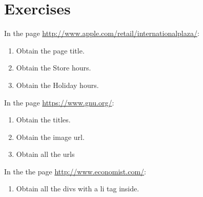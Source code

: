 \section{Exercises}

In the page \url{http://www.apple.com/retail/internationalplaza/}:\\

\begin{enumerate}
\item Obtain the page title.
\item Obtain the Store hours.
\item Obtain the Holiday hours.
\end{enumerate}

In the page \url{https://www.gnu.org/}:\\

\begin{enumerate}
\item Obtain the titles.
\item Obtain the image url.
\item Obtain all the urls
\end{enumerate}

In the the page \url{http://www.economist.com/}:

\begin{enumerate}
\item Obtain all the divs with a li tag inside.
\end{enumerate}

